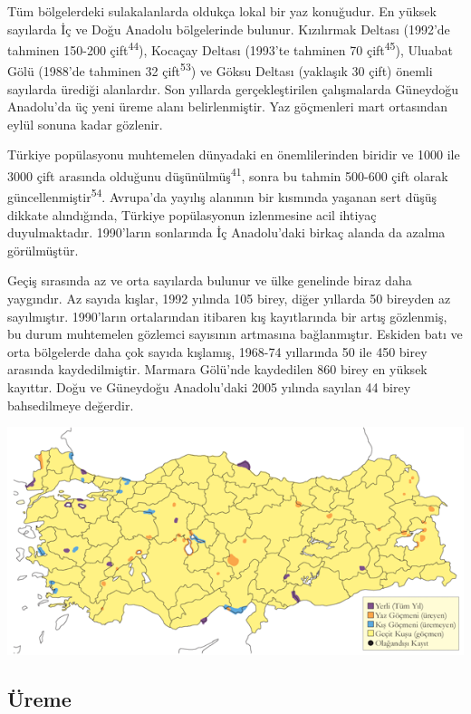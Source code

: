 \documentclass[
  letterpaper,
  DIV=11,
  numbers=noendperiod]{scrreprt}
\begin{document}
Tüm bölgelerdeki sulakalanlarda oldukça lokal bir yaz konuğudur. En
yüksek sayılarda İç ve Doğu Anadolu bölgelerinde bulunur. Kızılırmak
Deltası (1992'de tahminen 150-200 çift\textsuperscript{44}), Kocaçay
Deltası (1993'te tahminen 70 çift\textsuperscript{45}), Uluabat Gölü
(1988'de tahminen 32 çift\textsuperscript{53}) ve Göksu Deltası
(yaklaşık 30 çift) önemli sayılarda ürediği alanlardır. Son yıllarda
gerçekleştirilen çalışmalarda Güneydoğu Anadolu'da üç yeni üreme alanı
belirlenmiştir. Yaz göçmenleri mart ortasından eylül sonuna kadar
gözlenir.

Türkiye popülasyonu muhtemelen dünyadaki en önemlilerinden biridir ve
1000 ile 3000 çift arasında olduğunu düşünülmüş\textsuperscript{41},
sonra bu tahmin 500-600 çift olarak güncellenmiştir\textsuperscript{54}.
Avrupa'da yayılış alanının bir kısmında yaşanan sert düşüş dikkate
alındığında, Türkiye popülasyonun izlenmesine acil ihtiyaç
duyulmaktadır. 1990'ların sonlarında İç Anadolu'daki birkaç alanda da
azalma görülmüştür.

Geçiş sırasında az ve orta sayılarda bulunur ve ülke genelinde biraz
daha yaygındır. Az sayıda kışlar, 1992 yılında 105 birey, diğer yıllarda
50 bireyden az sayılmıştır. 1990'ların ortalarından itibaren kış
kayıtlarında bir artış gözlenmiş, bu durum muhtemelen gözlemci sayısının
artmasına bağlanmıştır. Eskiden batı ve orta bölgelerde daha çok sayıda
kışlamış, 1968-74 yıllarında 50 ile 450 birey arasında kaydedilmiştir.
Marmara Gölü'nde kaydedilen 860 birey en yüksek kayıttır. Doğu ve
Güneydoğu Anadolu'daki 2005 yılında sayılan 44 birey bahsedilmeye
değerdir.

\includegraphics{images/harita_Page_024.png}

\hypertarget{uxfcreme-23}{%
\subsection{\texorpdfstring{\textbf{Üreme}}{Üreme}}\label{uxfcreme-23}}
\end{document}
